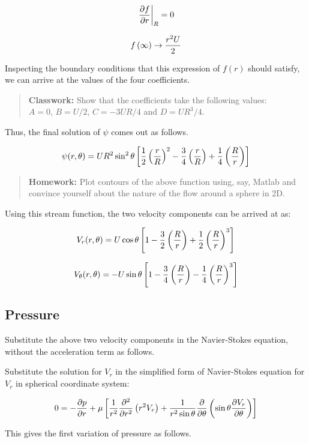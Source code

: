 $$ \left. {\partial f \over \partial r} \right|_R = 0 $$

$$ f\left(\infty\right) \rightarrow {r^2 U \over 2} $$


Inspecting the boundary conditions that this expression of $f(r)$ should satisfy, we can arrive at the values of the four coefficients.

\begin{quote}
{\bf Classwork:} Show that the coefficients take the following values: \\
$A=0$, $B=U/2$, $C =-3UR/4$ and $D=UR^3/4$.
\end{quote} 

Thus, the final solution of $\psi$ comes out as follows.

$$ \psi(r,\theta) = UR^2 \sin^2 \theta \left[ {1 \over 2} \left( r \over R \right)^2 - {3 \over 4} \left(r \over R\right) + {1 \over 4} \left( R \over r\right) \right] $$

\begin{quote}
{\bf Homework:} Plot contours of the above function using, say, Matlab and convince yourself about the nature of the flow around a sphere in 2D.
\end{quote}


Using this stream function, the two velocity components can be arrived at as:

$$ V_r(r,\theta) = U \cos\theta \left[ 1 - {3 \over 2} \left( R \over r\right) + {1 \over 2} \left( R \over r\right)^3 \right] $$

$$ V_\theta(r,\theta) = - U \sin\theta \left[ 1 - {3 \over 4} \left( R \over r\right) - {1 \over 4} \left( R \over r\right)^3 \right] $$

\subsection{Pressure}

Substitute the above two velocity components in the Navier-Stokes equation, without the acceleration term as follows.

Substitute the solution for $V_r$ in the simplified form of Navier-Stokes equation for $V_r$ in spherical coordinate system:

$$ 0 = - {\partial p \over \partial r} + \mu \left[ {1 \over r^2} {\partial^2 \over \partial r^2} \left( r^2 V_r \right) + {1 \over r^2 \sin\theta}{\partial \over \partial \theta} \left( \sin \theta {\partial V_r \over \partial \theta} \right) \right] $$

This gives the first variation of pressure as follows.

